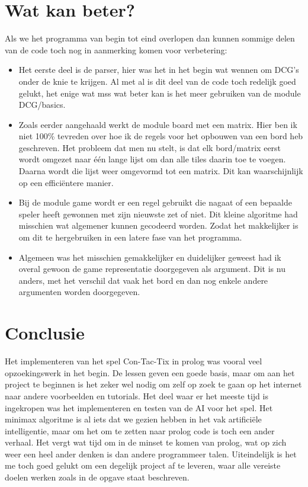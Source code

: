 \documentclass{article}
\begin{document}
\section{Wat kan beter?}
Als we het programma van begin tot eind overlopen dan kunnen sommige delen van de code toch nog in aanmerking komen voor verbetering:
\begin{itemize}
\item Het eerste deel is de parser, hier was het in het begin wat wennen om DCG's onder de knie te krijgen. Al met al is dit deel van de code toch redelijk goed gelukt, het enige wat mss wat beter kan is het meer gebruiken van de module DCG/basics.
\item Zoals eerder aangehaald werkt de module board met een matrix. Hier ben ik niet 100\% tevreden over hoe ik de regels voor het opbouwen van een bord heb geschreven. Het probleem dat men nu stelt, is dat elk bord/matrix eerst wordt omgezet naar één lange lijst om dan alle tiles daarin toe te voegen. Daarna wordt die lijst weer omgevormd tot een matrix. Dit kan waarschijnlijk op een efficiëntere manier.
\item Bij de module game wordt er een regel gebruikt die nagaat of een bepaalde speler heeft gewonnen met zijn nieuwste zet of niet. Dit kleine algoritme had misschien wat algemener kunnen gecodeerd worden. Zodat het makkelijker is om dit te hergebruiken in een latere fase van het programma.
\item Algemeen was het misschien gemakkelijker en duidelijker geweest had ik overal gewoon de game representatie doorgegeven als argument. Dit is nu anders, met het verschil dat vaak het bord en dan nog enkele andere argumenten worden doorgegeven.
\end{itemize}

\section{Conclusie} 
Het implementeren van het spel Con-Tac-Tix in prolog was vooral veel opzoekingswerk in het begin. De lessen geven een goede basis, maar om aan het project te beginnen is het zeker wel nodig om zelf op zoek te gaan op het internet naar andere voorbeelden en tutorials. Het deel waar er het meeste tijd is ingekropen was het implementeren en testen van de AI voor het spel. Het minimax algoritme is al iets dat we gezien hebben in het vak artificiële intelligentie, maar om het om te zetten naar prolog code is toch een ander verhaal. Het vergt wat tijd om in de minset te komen van prolog, wat op zich weer een heel ander denken is dan andere programmeer talen.\newline
Uiteindelijk is het me toch goed gelukt om een degelijk project af te leveren, waar alle vereiste doelen werken zoals in de opgave staat beschreven.
\end{document}
